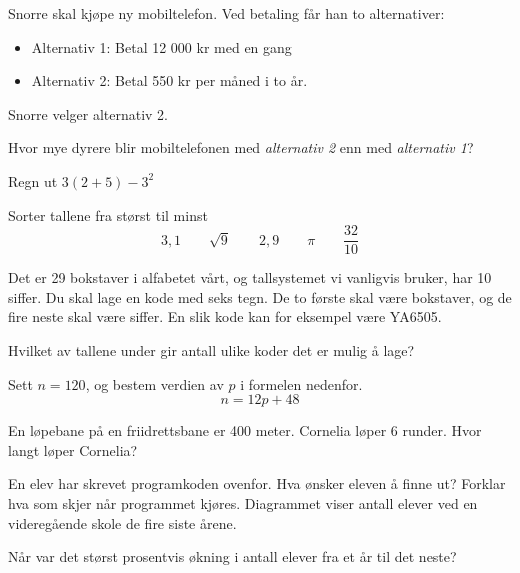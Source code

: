 Snorre skal kjøpe ny mobiltelefon.
Ved betaling får han to alternativer:
\begin{itemize}
	\item Alternativ 1: Betal 12 000 kr med en gang
	\item Alternativ 2: Betal 550 kr per måned i to år.
\end{itemize}
Snorre velger alternativ 2. \os

Hvor mye dyrere blir mobiltelefonen med \textsl{alternativ 2} enn med \textsl{alternativ 1}?

Regn ut $ 3(2+5)-3^2  $

Sorter tallene fra størst til minst
\[ 3,1\qquad\sqrt{9}\qquad2,9\qquad\pi \qquad \frac{32}{10} \]

Det er 29 bokstaver i alfabetet vårt, og tallsystemet vi vanligvis bruker, har 10 siffer.
Du skal lage en kode med seks tegn. De to første skal være bokstaver, og de fire neste skal være
siffer. En slik kode kan for eksempel være YA6505. \os

Hvilket av tallene under gir antall ulike koder det er mulig å lage? \os
{}

Sett $ n=120 $, og bestem verdien av $ p $ i formelen nedenfor. 
\[ n = 12p + 48 \]

En løpebane på en friidrettsbane er 400 meter.
Cornelia løper 6 runder. Hvor langt løper Cornelia? \os


En elev har skrevet programkoden ovenfor.
Hva ønsker eleven å finne ut?
Forklar hva som skjer når programmet kjøres.
\newpage
{}
Diagrammet viser antall elever ved en videregående skole de fire siste årene.\os

Når var det størst prosentvis økning i antall elever fra et år til det neste?
	




